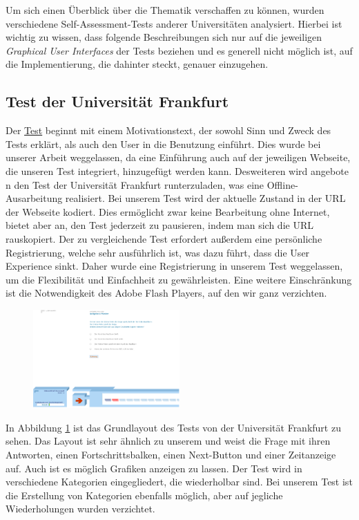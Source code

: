 \label{Jonas}
Um sich einen Überblick über die Thematik verschaffen zu können, wurden verschiedene Self-Assessment-Tests anderer Universitäten analysiert. Hierbei ist wichtig zu wissen, dass folgende Beschreibungen sich nur auf die jeweiligen \textit{Graphical User Interfaces} der Tests beziehen und es generell nicht möglich ist, auf die Implementierung, die dahinter steckt, genauer einzugehen.\break
\subsection{Test der Universität Frankfurt}
Der \href{https://www.gdv.informatik.uni-frankfurt.de/selfassessment/
Informatik/}{Test} beginnt mit einem Motivationstext, der sowohl Sinn und Zweck des Tests erklärt, als auch den User in die Benutzung einführt. Dies wurde bei unserer Arbeit weggelassen, da eine Einführung auch auf der jeweiligen Webseite, die unseren Test integriert, hinzugefügt werden kann. Desweiteren wird angebote n den Test der Universität Frankfurt runterzuladen, was eine Offline-Ausarbeitung realisiert. Bei unserem Test wird der aktuelle Zustand in der URL der Webseite kodiert. Dies ermöglicht zwar keine Bearbeitung ohne Internet, bietet aber an, den Test jederzeit zu pausieren, indem man sich die URL rauskopiert. Der zu vergleichende Test erfordert außerdem eine persönliche Registrierung, welche sehr ausführlich ist, was dazu führt, dass die User Experience sinkt. Daher wurde eine Registrierung in unserem Test weggelassen, um die Flexibilität und Einfachheit zu gewährleisten. Eine weitere Einschränkung ist die Notwendigkeit des Adobe Flash Players, auf den wir ganz verzichten. 
\begin{figure}[htbp] 
  \centering
     \includegraphics[width=0.5\textwidth]{Jonas_Images/frankfurt1.png}
  \caption{}
  \label{fig:Bild1}
\end{figure}
In Abbildung \ref{fig:Bild1} ist das Grundlayout des Tests von der Universität Frankfurt zu sehen. Das Layout ist sehr ähnlich zu unserem und weist die Frage mit ihren Antworten, einen Fortschrittsbalken, einen Next-Button und einer Zeitanzeige auf. Auch ist es möglich Grafiken anzeigen zu lassen. Der Test wird in verschiedene Kategorien eingegliedert, die wiederholbar sind. Bei unserem Test ist die Erstellung von Kategorien ebenfalls möglich, aber auf jegliche Wiederholungen wurden verzichtet.
